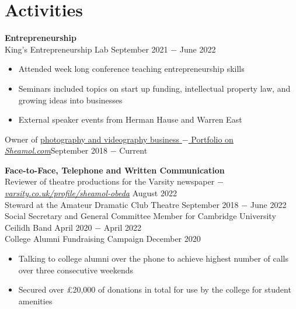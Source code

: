 \documentclass{article}
\begin{document}
\vspace{-.5\baselineskip}
\hrulefill
\vspace{-.5\baselineskip}

\clearpage
\section*{Activities}

\textbf{Entrepreneurship}\\
King's Entrepreneurship Lab \hfill September 2021 $-$ June 2022
\begin{itemize}
    \item Attended week long conference teaching entrepreneurship skills
    \item Seminars included topics on start up funding, intellectual property law, and growing ideas into businesses
    \item External speaker events from Herman Hause and Warren East 
\end{itemize}
Owner of \href{www.sheamol.com}{photography and videography business $-$ Portfolio on \underline{\textit{Sheamol.com}}}\hfill September 2018 $-$ Current\medskip

\textbf{Face-to-Face, Telephone and Written Communication}\\
Reviewer of theatre productions for the Varsity newspaper $-$ \href{https://www.varsity.co.uk/profile/sheamol-obeda}{\underline{\textit{varsity.co.uk/profile/sheamol-obeda}}} \hfill August 2022 \\
Steward at the Amateur Dramatic Club Theatre \hfill September 2018 $-$ June 2022 \\
Social Secretary and General Committee Member for Cambridge University Ceilidh Band \hfill April 2020 $-$ April 2022\\
College Alumni Fundraising Campaign \hfill December 2020
\begin{itemize}
    \item Talking to college alumni over the phone to achieve highest number of calls over three consecutive weekends
    \item Secured over £20,000 of donations in total for use by the college for student amenities
\end{itemize} \medskip
\end{document}
